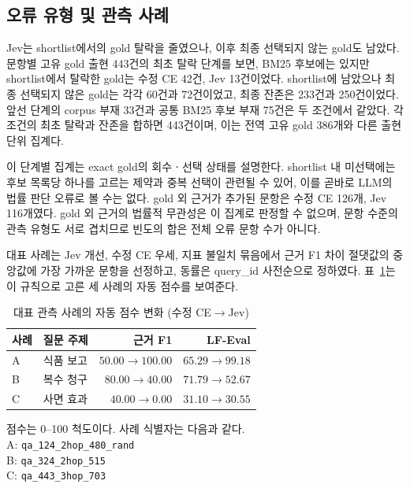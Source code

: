 \subsection{오류 유형 및 관측 사례}
\label{sec:ch4_errors}

Jev는 shortlist에서의 gold 탈락을 줄였으나, 이후 최종 선택되지 않는
gold도 남았다. 문항별 고유 gold 출현 443건의 최초 탈락 단계를 보면,
BM25 후보에는 있지만 shortlist에서 탈락한 gold는 수정 CE 42건,
Jev 13건이었다. shortlist에 남았으나 최종 선택되지 않은 gold는
각각 60건과 72건이었고, 최종 잔존은 233건과 250건이었다.
앞선 단계의 corpus 부재 33건과 공통 BM25 후보 부재 75건은
두 조건에서 같았다. 각 조건의 최초 탈락과 잔존을 합하면 443건이며,
이는 전역 고유 gold 386개와 다른 출현 단위 집계다.

이 단계별 집계는 exact gold의 회수ㆍ선택 상태를 설명한다.
shortlist 내 미선택에는 후보 목록당 하나를 고르는 제약과 중복 선택이
관련될 수 있어, 이를 곧바로 LLM의 법률 판단 오류로 볼 수는 없다.
gold 외 근거가 추가된 문항은 수정 CE 126개, Jev 116개였다.
gold 외 근거의 법률적 무관성은 이 집계로 판정할 수 없으며,
문항 수준의 관측 유형도 서로 겹치므로 빈도의 합은 전체 오류 문항
수가 아니다.

대표 사례는 Jev 개선, 수정 CE 우세, 지표 불일치 묶음에서
근거 F1 차이 절댓값의 중앙값에 가장 가까운 문항을 선정하고,
동률은 query\_id 사전순으로 정하였다.
표~\ref{tab:ch4_cases}는 이 규칙으로 고른 세 사례의 자동 점수를 보여준다.

\begin{table}[htbp]
    \centering
    \caption{대표 관측 사례의 자동 점수 변화 (수정 CE$\to$Jev)}
    \label{tab:ch4_cases}
    \small
    \setlength{\tabcolsep}{4pt}
    \begin{tabular}{@{}llrr@{}}
        \hline
        사례 & 질문 주제 & 근거 F1 & LF-Eval \\
        \hline
        A & 식품 보고 & $50.00\to100.00$ & $65.29\to99.18$ \\
        B & 복수 청구 & $80.00\to40.00$  & $71.79\to52.67$ \\
        C & 사면 효과 & $40.00\to0.00$   & $31.10\to30.55$ \\
        \hline
    \end{tabular}
    \par\smallskip
    \begin{minipage}{\linewidth}
        \footnotesize
        점수는 0--100 척도이다. 사례 식별자는 다음과 같다.\\
        A: \texttt{qa\_124\_2hop\_480\_rand}\\
        B: \texttt{qa\_324\_2hop\_515}\\
        C: \texttt{qa\_443\_3hop\_703}
    \end{minipage}
\end{table}

